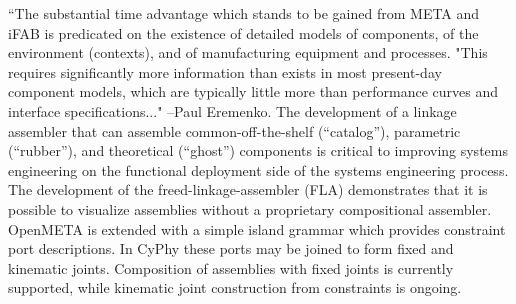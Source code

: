 \documentclass[]{report}
\begin{document}
“The substantial time advantage which stands to be gained from META and iFAB is 
predicated on the existence of detailed models of components, of the environment (contexts),
and of manufacturing equipment and processes. 
"This requires significantly more information than exists in most present-day component models, 
which are typically little more than performance curves and interface specifications..." --Paul Eremenko. 
The development of a linkage assembler that can assemble 
common-off-the-shelf  (“catalog”), parametric (“rubber”), and 
theoretical (“ghost”) components is critical to improving systems engineering 
on the functional deployment side of the systems engineering process. 
The development of the freed-linkage-assembler (FLA) demonstrates that it is 
possible to visualize assemblies without a proprietary compositional assembler. 
OpenMETA is extended with a simple island grammar which provides constraint port descriptions.  
In CyPhy these ports may be joined to form fixed and kinematic joints. 
Composition of assemblies with fixed joints is currently supported, while kinematic joint construction from constraints is ongoing.

	
\end{document}
